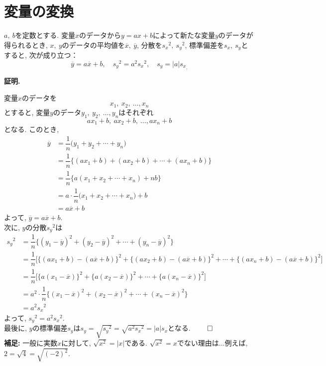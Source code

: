 \documentclass[a4paper,onecolumn,dvipdfmx]{jsarticle}
\theoremstyle{mydefinition}
\newtheorem[leftline=false,backgroundcolor=black!30!white]{thm}[dfn]{定理}
\newcommand{\abs}[1]{\left|#1\right|}
\begin{document}
\gtfamily
	\section*{\textbf{変量の変換}}
	\begin{thm}
	\gtfamily
		$a,\ b$を定数とする. 変量$x$のデータから$y=ax+b$によって新たな変量$y$のデータが得られるとき, $x,\ y$のデータの平均値を$\overline{x},\ \overline{y}$, 分散を${s_x}^2,\ {s_y}^2$, 標準偏差を$s_x,\ s_y$とすると, 次が成り立つ：\[\overline{y}=a\overline{x}+b,\quad {s_y}^2=a^2{s_x}^2,\quad s_y=\abs{a}{s_x}_.\]
	\end{thm}
	
	\noindent\textbf{証明.}
	
	変量$x$のデータを\[x_1,\ x_2,\ \ldots,x_n\]とすると, 変量$y$のデータ$y_1,\ y_2,\ \ldots,y_n$はそれぞれ\[ax_1+b,\ ax_2+b,\ \ldots,ax_n+b\]となる. このとき, 
	\begin{align*}
		\overline{y}&=\dfrac{1}{n}\bigg(y_1+y_2+\cdots+y_n\bigg)\\[1zw]
		                 &=\dfrac{1}{n}\bigg\{(ax_1+b)+(ax_2+b)+\cdots+(ax_n+b)\bigg\}\\[1zw]
		                 &=\dfrac{1}{n}\bigg\{a(x_1+x_2+\cdots+x_n)+nb\bigg\}\\[1zw]
		                 &=a\cdot\dfrac{1}{n}\bigg(x_1+x_2+\cdots+x_n\bigg)+b\\[1zw]
		                 &=a\overline{x}+b
	\end{align*}
	よって, $\overline{y}=a\overline{x}+b.$\\
	
	\noindent 次に, $y$の分散${s_y}^2$は
	\begin{align*}
		{s_y}^2&=\dfrac{1}{n}\bigg\{(y_1-\overline{y})^2+(y_2-\overline{y})^2+\cdots+(y_n-\overline{y})^2\bigg\}\\[1zw]
		&=\dfrac{1}{n}\bigg[\big\{(ax_1+b)-(a\overline{x}+b)\big\}^2+\big\{(ax_2+b)-(a\overline{x}+b)\big\}^2+\cdots+\big\{(ax_n+b)-(a\overline{x}+b)\big\}^2\bigg]\\[1zw]
		&=\dfrac{1}{n}\bigg[\big\{a(x_1-\overline{x})\big\}^2+\big\{a(x_2-\overline{x})\big\}^2+\cdots+\big\{a(x_n-\overline{x})\big\}^2\bigg]\\[1zw]
		&=a^2\cdot\dfrac{1}{n}\bigg\{(x_1-\overline{x})^2+(x_2-\overline{x})^2+\cdots+(x_n-\overline{x})^2\bigg\}\\[1zw]
		&=a^2{s_x}^2
	\end{align*}
	よって, ${s_y}^2=a^2{s_x}^2.$\\
	
	\noindent 最後に, $y$の標準偏差$s_y$は$s_y=\sqrt{{s_y}^2}=\sqrt{a^2{s_x}^2}=\abs{a}{s_x}$となる. \hfill$\qed$\\
	
	
	
	\noindent\textbf{補足:} 一般に実数$x$に対して, $\sqrt{x^2}=\abs{x}$である. $\sqrt{x^2}=x$でない理由は...例えば, $2=\sqrt{4}=\sqrt{(-2)^2}.$

	
	
	
	
	
	
	
	
	
	
	
\end{document}

